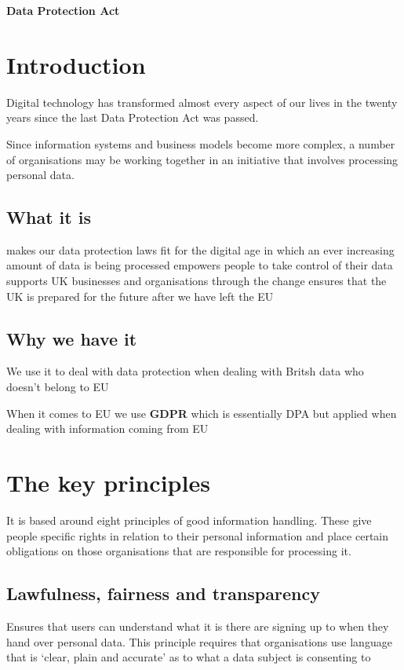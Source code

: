 \documentclass[a4paper,12pt]{article}
\begin{document}
\textbf{Data Protection Act}


\tableofcontents
\clearpage

 
\section{Introduction}

Digital technology has transformed almost every aspect of our lives in the twenty years since the last Data Protection Act was passed.

Since information systems and business models become more
complex, a number of organisations may be working together
in an initiative that involves processing personal data.

\subsection{What it is}

makes our data protection laws fit for the digital age in which an ever increasing amount of data is being processed
empowers people to take control of their data
supports UK businesses and organisations through the change
ensures that the UK is prepared for the future after we have left the EU

 
\subsection{Why we have it}
 We use it to deal with data protection when dealing with Britsh data who doesn't belong to EU
 
When it comes to EU we use \textbf{GDPR} which is essentially DPA but applied when dealing with information coming from EU
\clearpage

\section{The key principles}
It is based around eight
principles of good information handling. These give people
specific rights in relation to their personal information and
place certain obligations on those organisations that are
responsible for processing it.

\subsection {Lawfulness, fairness and transparency}
Ensures that users can understand what it is there are signing up to when they hand over personal data. This principle requires that organisations use language that is ‘clear, plain and accurate’ as to what a data subject is consenting to
\end{document}

